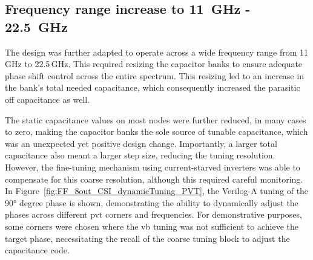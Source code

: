 \subsection{Frequency range increase to 11~GHz - 22.5~GHz}\label{sec:freq_range}

The design was further adapted to operate across a wide frequency range from 11\,GHz to 22.5\,GHz. This required resizing the capacitor banks to ensure adequate phase shift control across the entire spectrum. This resizing led to an increase in the bank's total needed capacitance, which consequently increased the parasitic off capacitance as well.

The static capacitance values on most nodes were further reduced, in many cases to zero, making the capacitor banks the sole source of tunable capacitance, which was an unexpected yet positive design change. Importantly, a larger total capacitance also meant a larger step size, reducing the tuning resolution. However, the fine-tuning mechanism using current-starved inverters was able to compensate for this coarse resolution, although this required careful monitoring. In Figure~\ref{fig:FF_8out_CSI_dynamicTuning_PVT}, the Verilog-A tuning of the \ang{90} degree phase is shown, demonstrating the ability to dynamically adjust the phases across different \gls{pvt} corners and frequencies. For demonstrative purposes, some corners were chosen where the vb tuning was not sufficient to achieve the target phase, necessitating the recall of the coarse tuning block to adjust the capacitance code.

